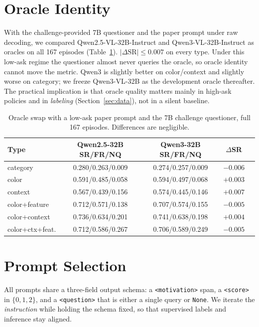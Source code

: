 \documentclass[10pt,a4paper]{article}
\begin{document}
\section{Oracle Identity}
\label{sec:oracle}

With the challenge-provided 7B questioner and the paper prompt under
raw decoding, we compared Qwen2.5-VL-32B-Instruct and
Qwen3-VL-32B-Instruct as oracles on all 167 episodes
(Table~\ref{tab:oracle}). $|\Delta\mathrm{SR}|\le 0.007$ on every type. Under this low-ask regime the questioner almost never
queries the oracle, so oracle identity cannot move the metric. Qwen3 is
slightly better on color/context and slightly worse on category; we
freeze Qwen3-VL-32B as the development oracle thereafter. The practical
implication is that oracle quality matters mainly in high-ask policies
and in \emph{labeling} (Section~\ref{sec:data}), not in a silent
baseline.

\begin{table}[h]
\centering
\small
\begin{tabular}{lcccc}
\toprule
Type & Qwen2.5-32B SR/FR/NQ & Qwen3-32B SR/FR/NQ & $\Delta$SR \\
\midrule
category & 0.280/0.263/0.009 & 0.274/0.257/0.009 & $-0.006$ \\
color & 0.591/0.485/0.058 & 0.594/0.497/0.068 & $+0.003$ \\
context & 0.567/0.439/0.156 & 0.574/0.445/0.146 & $+0.007$ \\
color+feature & 0.712/0.571/0.138 & 0.707/0.574/0.155 & $-0.005$ \\
color+context & 0.736/0.634/0.201 & 0.741/0.638/0.198 & $+0.004$ \\
color+ctx+feat. & 0.712/0.586/0.267 & 0.706/0.589/0.249 & $-0.005$ \\
\bottomrule
\end{tabular}
\caption{Oracle swap with a low-ask paper prompt and the 7B challenge
questioner, full 167 episodes. Differences are negligible.}
\label{tab:oracle}
\end{table}

\section{Prompt Selection}
\label{sec:prompt}

All prompts share a three-field output schema: a
\texttt{<motivation>} span, a \texttt{<score>} in $\{0,1,2\}$, and a
\texttt{<question>} that is either a single query or \texttt{None}.
We iterate the \emph{instruction} while holding the schema fixed, so
that supervised labels and inference stay aligned.
\end{document}
